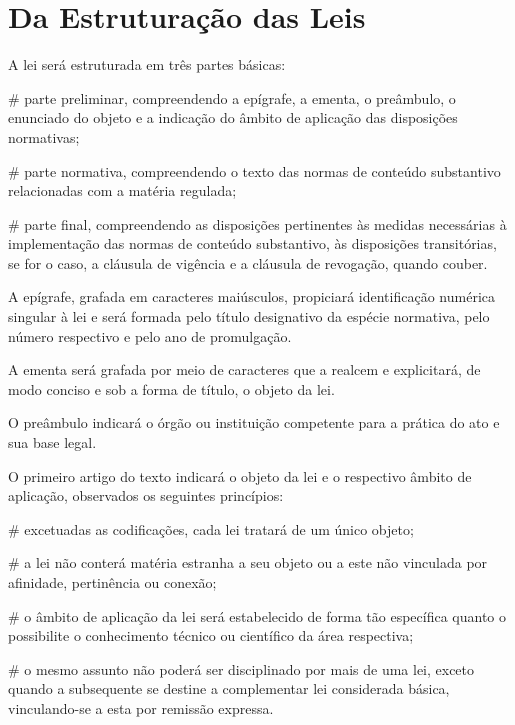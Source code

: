\documentclass[a5paper,capitulo,titlepage=false]{br-lex}
\begin{document}
\section{Da Estruturação das Leis}

\artigo A lei será estruturada em três partes básicas:

\begin{easylist}
# parte preliminar, compreendendo a epígrafe, a ementa, o preâmbulo, o enunciado do objeto e a indicação do âmbito de aplicação das disposições normativas;

#  parte normativa, compreendendo o texto das normas de conteúdo substantivo relacionadas com a matéria regulada;

#  parte final, compreendendo as disposições pertinentes às medidas necessárias à implementação das normas de conteúdo substantivo, às disposições transitórias, se for o caso, a cláusula de vigência e a cláusula de revogação, quando couber.
\end{easylist}

\artigo A epígrafe, grafada em caracteres maiúsculos, propiciará identificação numérica singular à lei e será formada pelo título designativo da espécie normativa, pelo número respectivo e pelo ano de promulgação.

\artigo A ementa será grafada por meio de caracteres que a realcem e explicitará, de modo conciso e sob a forma de título, o objeto da lei.

\artigo O preâmbulo indicará o órgão ou instituição competente para a prática do ato e sua base legal.

\artigo O primeiro artigo do texto indicará o objeto da lei e o respectivo âmbito de aplicação, observados os seguintes princípios:

\begin{easylist}
#  excetuadas as codificações, cada lei tratará de um único objeto;

#  a lei não conterá matéria estranha a seu objeto ou a este não vinculada por afinidade, pertinência ou conexão;

#  o âmbito de aplicação da lei será estabelecido de forma tão específica quanto o possibilite o conhecimento técnico ou científico da área respectiva;

#  o mesmo assunto não poderá ser disciplinado por mais de uma lei, exceto quando a subsequente se destine a complementar lei considerada básica, vinculando-se a esta por remissão expressa.
\end{easylist}
\end{document}
